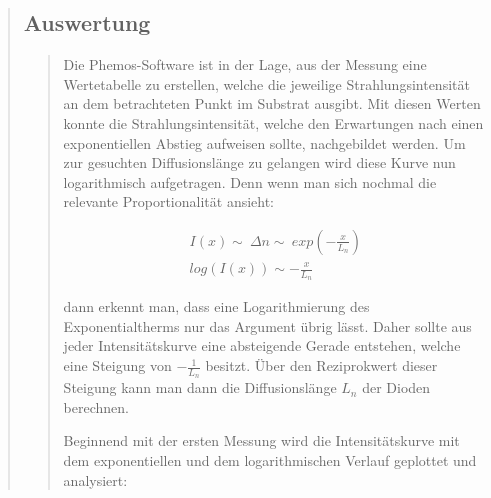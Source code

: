 \begin{quote}
\begin{quote}
        \end{quote}


        \subsection{Auswertung}
        \begin{quote}

        Die Phemos-Software ist in der Lage, aus der Messung eine Wertetabelle
        zu erstellen, welche die jeweilige Strahlungsintensität an dem
        betrachteten Punkt im Substrat ausgibt. Mit diesen Werten konnte die
        Strahlungsintensität, welche den Erwartungen nach einen exponentiellen
        Abstieg aufweisen sollte, nachgebildet werden. Um zur gesuchten
        Diffusionslänge zu gelangen wird diese Kurve nun logarithmisch
        aufgetragen. Denn wenn man sich nochmal die relevante Proportionalität
        ansieht:

        \begin{equation*}
        \begin{split}
            I(x) \sim \ \Delta n \sim \ exp(-\frac{x}{L_n})\\
            log(I(x)) \sim -\frac{x}{L_n}
        \end{split}
        \end{equation*}

        dann erkennt man, dass eine Logarithmierung des Exponentialtherms nur
        das Argument übrig lässt. Daher sollte aus jeder Intensitätskurve
        eine absteigende Gerade entstehen, welche eine Steigung von $-\frac{1}{L_n}$
        besitzt. Über den Reziprokwert dieser Steigung kann man dann die
        Diffusionslänge $L_n$ der Dioden berechnen.

        \vspace{1em}

        Beginnend mit der ersten Messung wird die Intensitätskurve mit dem
        exponentiellen und dem logarithmischen Verlauf geplottet und analysiert:


\end{quote}
\end{quote}
